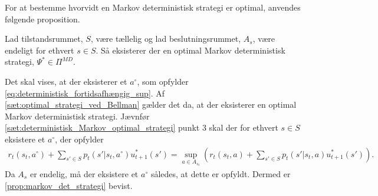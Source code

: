 For at bestemme hvorvidt en Markov deterministisk strategi er optimal, anvendes følgende proposition. 

\begin{minipage}\textwidth
\begin{pro} \textbf{}\label{prop:markov_det_strategi} %
\newline
Lad tilstandsrummet, $S$, være tællelig og lad beslutningsrummet, $A_s$, være endeligt for ethvert $s\in S$. Så eksisterer der en optimal Markov deterministisk strategi, $\Psi^*\in \Pi^{MD}$.  
\end{pro}
\end{minipage}

\begin{bev} \textbf{} %
\newline
Det skal vises, at der eksisterer et $a^\circ$, som opfylder \eqref{eq:deterministisk_fortidsafhængig_sup}. Af \autoref{sæt:optimal_strategi_ved_Bellman} gælder det da, at der eksisterer en optimal Markov deterministisk strategi.  
Jævnfør \autoref{sæt:deterministisk_Markov_optimal_strategi} punkt 3 skal der for ethvert $s\in S$ eksistere et $a^\circ$, der opfylder
\begin{align*}
    r_t(s_t,a^\circ) + \sum_{s'\in S}p_t\left(s' | s_t, a^\circ\right)u^*_{t+1}(s')\nonumber 
    = \sup_{a \in A_{s_t}}\left(r_t(s_t,a) +  \sum_{s'\in S}p_t\left(s' | s_t,a\right)u^*_{t+1}(s')\right).
\end{align*}
Da $A_s$ er endelig, må der eksistere et $a^\circ$ således, at dette er opfyldt. Dermed er \autoref{prop:markov_det_strategi} bevist.
\end{bev}






